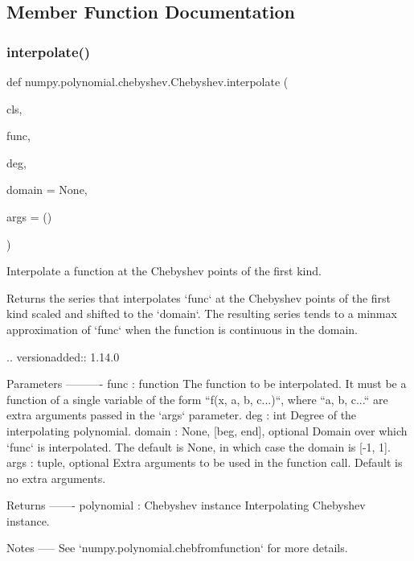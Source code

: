\subsection{Member Function Documentation}
\mbox{\label{classnumpy_1_1polynomial_1_1chebyshev_1_1Chebyshev_ab13e941fd82e439d55cca84f1634db0d}} 
\subsubsection{\texorpdfstring{interpolate()}{interpolate()}}
{\footnotesize\ttfamily def numpy.\+polynomial.\+chebyshev.\+Chebyshev.\+interpolate (\begin{DoxyParamCaption}\item[{}]{cls,  }\item[{}]{func,  }\item[{}]{deg,  }\item[{}]{domain = {\ttfamily None},  }\item[{}]{args = {\ttfamily ()} }\end{DoxyParamCaption})}

\begin{DoxyVerb}Interpolate a function at the Chebyshev points of the first kind.

Returns the series that interpolates `func` at the Chebyshev points of
the first kind scaled and shifted to the `domain`. The resulting series
tends to a minmax approximation of `func` when the function is
continuous in the domain.

.. versionadded:: 1.14.0

Parameters
----------
func : function
    The function to be interpolated. It must be a function of a single
    variable of the form ``f(x, a, b, c...)``, where ``a, b, c...`` are
    extra arguments passed in the `args` parameter.
deg : int
    Degree of the interpolating polynomial.
domain : {None, [beg, end]}, optional
    Domain over which `func` is interpolated. The default is None, in
    which case the domain is [-1, 1].
args : tuple, optional
    Extra arguments to be used in the function call. Default is no
    extra arguments.

Returns
-------
polynomial : Chebyshev instance
    Interpolating Chebyshev instance.

Notes
-----
See `numpy.polynomial.chebfromfunction` for more details.\end{DoxyVerb}
 

